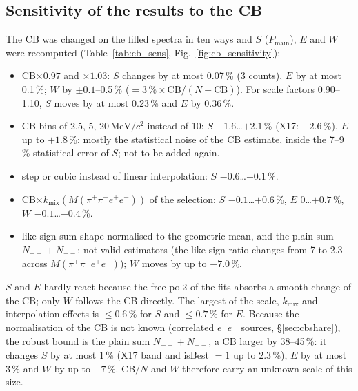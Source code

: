\documentclass[11pt,a4paper]{article}
\newcommand{\Mfour}{\ensuremath{M(\pi^{+}\pi^{-}e^{+}e^{-})}\xspace}
\newcommand{\MeVcc}{\ensuremath{\mathrm{MeV}/c^{2}}\xspace}
\newcommand{\Pmain}{\ensuremath{P_{\mathrm{main}}}\xspace}
\begin{document}
\subsection{Sensitivity of the results to the CB}
\label{sec:cbsens}
The CB was changed on the filled spectra in ten ways and $S$ (\Pmain), $E$ and $W$ were recomputed
(Table~\ref{tab:cb_sens}, Fig.~\ref{fig:cb_sensitivity}):
\begin{itemize}
\setlength{\itemsep}{0pt}
\item CB$\times0.97$ and $\times1.03$: $S$ changes by at most 0.07\,\% (3 counts), $E$ by at most 0.1\,\%; $W$ by
      $\pm0.1$--0.5\,\% ($=3\,\%\times\mathrm{CB}/(N-\mathrm{CB})$). For scale factors 0.90--1.10, $S$ moves by at most
      0.23\,\% and $E$ by 0.36\,\%.
\item CB bins of 2.5, 5, 20\,\MeVcc instead of 10: $S$ $-1.6$\dots$+2.1$\,\% (X17: $-2.6$\,\%), $E$ up to $+1.8$\,\%; mostly
      the statistical noise of the CB estimate, inside the 7--9\,\% statistical error of $S$; not to be added again.
\item step or cubic instead of linear interpolation: $S$ $-0.6$\dots$+0.1$\,\%.
\item CB$\times k_{\mathrm{mix}}(\Mfour)$ of the selection: $S$ $-0.1$\dots$+0.6$\,\%, $E$ 0\dots$+0.7$\,\%, $W$
      $-0.1$\dots$-0.4$\,\%.
\item like-sign sum shape normalised to the geometric mean, and the plain sum $N_{++}+N_{--}$: not valid estimators
      (the like-sign ratio changes from 7 to 2.3 across \Mfour); $W$ moves by up to $-7.0$\,\%.
\end{itemize}
$S$ and $E$ hardly react because the free pol2 of the fits absorbs a smooth change of the CB; only $W$ follows the CB
directly. The largest of the scale, $k_{\mathrm{mix}}$ and interpolation effects is $\le0.6$\,\% for $S$ and $\le0.7$\,\% for
$E$. Because the normalisation of the CB is not known (correlated $e^-e^-$ sources, \S\ref{sec:cbshare}), the robust bound
is the plain sum $N_{++}+N_{--}$, a CB larger by 38--45\,\%: it changes $S$ by at most 1\,\% (X17 band and isBest $=1$ up to
2.3\,\%), $E$ by at most 3\,\% and $W$ by up to $-7$\,\%. CB$/N$ and $W$ therefore carry an unknown scale of this size.


\end{document}
